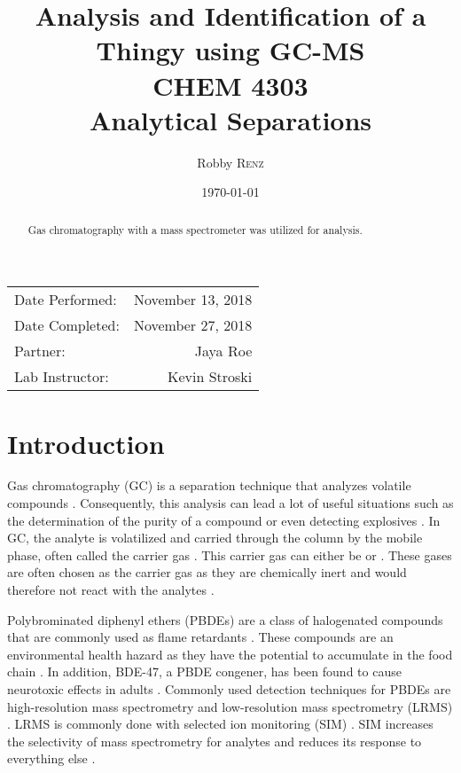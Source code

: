 \documentclass[a4paper, 12pt]{article}
\title{Analysis and Identification of a Thingy using GC-MS \\ CHEM 4303 \\ Analytical Separations} %
\author{Robby \textsc{Renz}} %
\date{\today} %
\begin{document}
\maketitle %

\begin{center}
\begin{tabular}{l r}
Date Performed: & November 13, 2018 \\ %
Date Completed: & November 27, 2018 \\
Partner: & Jaya Roe \\ %
Lab Instructor: & Kevin Stroski %
\end{tabular}
\end{center}


\begin{abstract}
	Gas chromatography with a mass spectrometer was utilized for analysis.
\end{abstract}
\newpage


\section{Introduction}
Gas chromatography (GC) is a separation technique that analyzes volatile compounds \cite{vitha_chromatography:_2017}. Consequently, this analysis can lead a lot of useful situations such as the determination of the purity of a compound or even detecting explosives \cite{vitha_chromatography:_2017}. In GC, the analyte is volatilized and carried through the column by the mobile phase, often called the carrier gas \cite{harris}. This carrier gas can either be  or  \cite{harris}. These gases are often chosen as the carrier gas as they are chemically inert and would therefore not react with the analytes \cite{vitha_chromatography:_2017}.

Polybrominated diphenyl ethers (PBDEs) are a class of halogenated compounds that are commonly used as flame retardants \cite{bjorklund_mass_2003}. These compounds are an environmental health hazard as they have the potential to accumulate in the food chain \cite{thomsen_comparing_2002}. In addition, BDE-47, a PBDE congener, has been found to cause neurotoxic effects in adults \cite{thomsen_comparing_2002}. Commonly used detection techniques for PBDEs are high-resolution mass spectrometry and low-resolution mass spectrometry (LRMS) \cite{bjorklund_mass_2003}. LRMS is commonly done with selected ion monitoring (SIM) \cite{bjorklund_mass_2003}. SIM increases the selectivity of mass spectrometry for analytes and reduces its response to everything else \cite{harris}.
\end{document}
